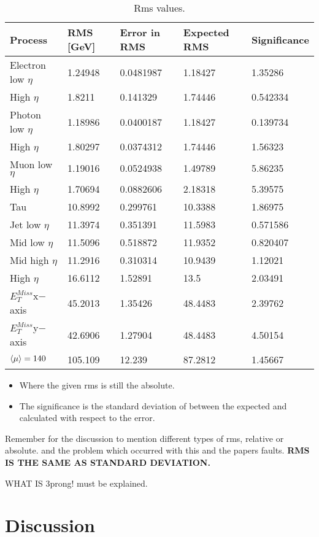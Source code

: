 \begin{table}[H]
\begin{center}
\begin{tabular}{|l|l|l|l|l|}
\hline
Process&RMS [GeV]&Error in RMS&Expected RMS& Significance\\ \hline
Electron low $\eta$&1.24948&0.0481987&1.18427&1.35286\\
High $\eta$&1.8211&0.141329&1.74446&0.542334\\ \hline
Photon low $\eta$&1.18986&0.0400187&1.18427&0.139734\\
High $\eta$&1.80297&0.0374312&1.74446&1.56323\\ \hline
Muon low $\eta$&1.19016&0.0524938&1.49789&5.86235\\
High $\eta$&1.70694&0.0882606&2.18318&5.39575\\ \hline
Tau&10.8992&0.299761&10.3388&1.86975\\ \hline
Jet low $\eta$&11.3974&0.351391&11.5983&0.571586\\
Mid low $\eta$&11.5096&0.518872&11.9352&0.820407\\
Mid high $\eta$&11.2916&0.310314&10.9439&1.12021\\
High $\eta$&16.6112&1.52891&13.5&2.03491\\ \hline
$E_T^{Miss} $x$-$axis&45.2013&1.35426&48.4483&2.39762\\ \hline
$E_T^{Miss} $y$-$axis&42.6906&1.27904&48.4483&4.50154\\ 
$\left<\mu\right>=140$&105.109&12.239&87.2812&1.45667\\  \hline
\end{tabular}
\end{center}
\caption{Rms values.}
\label{tab:rmsval}
\end{table}
\begin{itemize}
\item Where the given rms is still the absolute. 
\item The significance is the standard deviation of between the expected and calculated with respect to the error.
\end{itemize}
Remember for the discussion to mention different types of rms, relative or absolute. and the problem which occurred with this and the papers faults. \textbf{RMS IS THE SAME AS STANDARD DEVIATION.}

WHAT IS 3prong! must be explained.
\section{Discussion}




